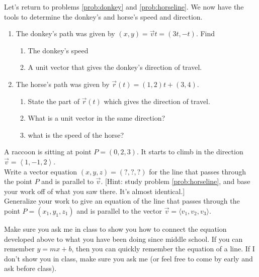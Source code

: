 \begin{problem}
Let's return to problems \ref{prob:donkey} and \ref{prob:horseline}. We now have the tools to determine the donkey's and horse's speed and direction.
\begin{enumerate} 
	\item The donkey's path was given by $(x,y)=\vec v t = (3t,-t)$. Find
	\begin{enumerate}
		\item The donkey's speed
		\item A unit vector that gives the donkey's direction of travel.
	\end{enumerate}
	\item The horse's path was given by $\vec r(t) = (1,2)t + (3,4) $.
	\begin{enumerate}
		\item State the part of $\vec r(t)$ which gives the direction of travel.
		\item What is a unit vector in the same direction?
		\item what is the speed of the horse?
	\end{enumerate}
\end{enumerate}
\end{problem}


\begin{problem}
%
A raccoon is sitting at point $P=(0,2,3)$.  It starts to climb in the direction $\vec v=\left<1,-1,2\right>$.\\
Write a vector equation $(x,y,z)=(?,?,?)$ for the line that passes through the point $P$ and is parallel to $\vec v$. [Hint: study problem \ref{prob:horseline}, and base your work off of what you saw there. It's almost identical.] \\
Generalize your work to give an equation of the line that passes through the point $P=(x_1,y_1,z_1)$ and is parallel to the vector $\vec v=\langle v_1,v_2,v_3 \rangle$. 
\end{problem}

Make sure you ask me in class to show you how to connect the equation developed above to what you have been doing since middle school. If you can remember $y=mx+b$, then you can quickly remember the equation of a line.  If I don't show you in class, make sure you ask me (or feel free to come by early and ask before class).


